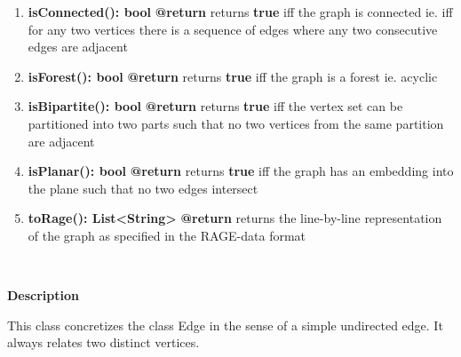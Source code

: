 \begin{enumerate}[+]
{		}
		\item{
			\textbf{isConnected(): bool} \newline
			\textbf{@return} returns \textbf{true} iff the graph is connected ie. iff for any two vertices there is a sequence of edges where any two consecutive edges are adjacent
		}
		\item{
			\textbf{isForest(): bool} \newline
			\textbf{@return} returns \textbf{true} iff the graph is a forest ie. acyclic
		}
		\item{
			\textbf{isBipartite(): bool} \newline
			\textbf{@return} returns \textbf{true} iff the vertex set can be partitioned into two parts such that no two vertices from the same partition are adjacent
		}
		\item{
			\textbf{isPlanar(): bool} \newline
			\textbf{@return} returns \textbf{true} iff the graph has an embedding into the plane such that no two edges intersect
		}
		\item{
			\textbf{toRage(): List<String>} \newline
			\textbf{@return} returns the line-by-line representation of the graph as specified in the RAGE-data format
		}
	\end{enumerate}
	
	~\newline
	~\newline
	~\newline
	
	
	\textbf{Description}
	
	This class concretizes the class Edge in the sense of a simple undirected edge. It always relates two distinct vertices.
		
